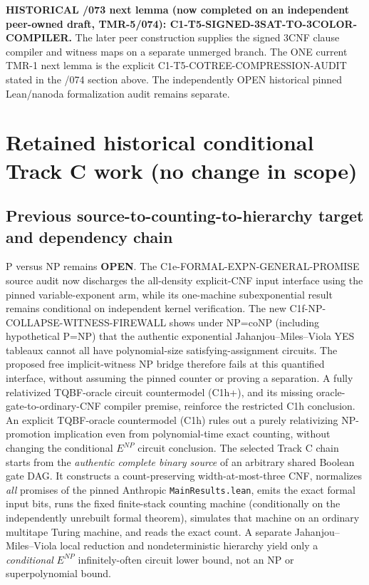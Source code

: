 \documentclass[11pt]{article}
\begin{document}
\textbf{HISTORICAL /073 next lemma (now completed on an
independent peer-owned draft, TMR-5/074):
C1-T5-SIGNED-3SAT-TO-3COLOR-COMPILER.}
The later peer construction supplies the signed 3CNF
clause compiler and witness maps on a separate unmerged
branch. The ONE current TMR-1 next lemma is the explicit
C1-T5-COTREE-COMPRESSION-AUDIT stated in the /074
section above. The independently OPEN historical pinned
Lean/nanoda formalization audit remains separate.

\section{Retained historical conditional Track C work (no change in scope)}

\subsection{Previous source-to-counting-to-hierarchy target and dependency chain}
P versus NP remains \textbf{OPEN}. The C1e-FORMAL-EXPN-GENERAL-PROMISE source audit now discharges the all-density explicit-CNF input interface using the pinned variable-exponent arm, while its one-machine subexponential result remains conditional on independent kernel verification. The new C1f-NP-COLLAPSE-WITNESS-FIREWALL shows under NP=coNP (including hypothetical P=NP) that the authentic exponential Jahanjou--Miles--Viola YES tableaux cannot all have polynomial-size satisfying-assignment circuits. The proposed free implicit-witness NP bridge therefore fails at this quantified interface, without assuming the pinned counter or proving a separation. A fully relativized TQBF-oracle circuit countermodel (C1h+), and its missing oracle-gate-to-ordinary-CNF compiler premise, reinforce the restricted C1h conclusion. An explicit TQBF-oracle countermodel (C1h) rules out a purely relativizing NP-promotion implication even from polynomial-time exact counting, without changing the conditional $E^{NP}$ circuit conclusion. The selected Track C chain starts from the \emph{authentic complete binary source} of an arbitrary shared Boolean gate DAG. It constructs a count-preserving width-at-most-three CNF, normalizes \emph{all} promises of the pinned Anthropic \texttt{MainResults.lean}, emits the exact formal input bits, runs the fixed finite-stack counting machine (conditionally on the independently unrebuilt formal theorem), simulates that machine on an ordinary multitape Turing machine, and reads the exact count. A separate Jahanjou--Miles--Viola local reduction and nondeterministic hierarchy yield only a \emph{conditional} $E^{NP}$ infinitely-often circuit lower bound, not an NP or superpolynomial bound.
\end{document}
